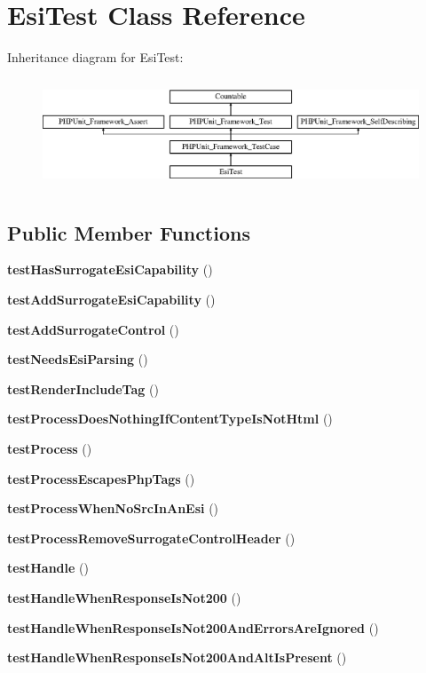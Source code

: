 \section{Esi\+Test Class Reference}
\label{class_symfony_1_1_component_1_1_http_kernel_1_1_tests_1_1_http_cache_1_1_esi_test}
Inheritance diagram for Esi\+Test\+:\begin{figure}[H]
\begin{center}
\leavevmode
\includegraphics[height=3.303835cm]{class_symfony_1_1_component_1_1_http_kernel_1_1_tests_1_1_http_cache_1_1_esi_test}
\end{center}
\end{figure}
\subsection*{Public Member Functions}
\begin{DoxyCompactItemize}
\item 
{\bf test\+Has\+Surrogate\+Esi\+Capability} ()
\item 
{\bf test\+Add\+Surrogate\+Esi\+Capability} ()
\item 
{\bf test\+Add\+Surrogate\+Control} ()
\item 
{\bf test\+Needs\+Esi\+Parsing} ()
\item 
{\bf test\+Render\+Include\+Tag} ()
\item 
{\bf test\+Process\+Does\+Nothing\+If\+Content\+Type\+Is\+Not\+Html} ()
\item 
{\bf test\+Process} ()
\item 
{\bf test\+Process\+Escapes\+Php\+Tags} ()
\item 
{\bf test\+Process\+When\+No\+Src\+In\+An\+Esi} ()
\item 
{\bf test\+Process\+Remove\+Surrogate\+Control\+Header} ()
\item 
{\bf test\+Handle} ()
\item 
{\bf test\+Handle\+When\+Response\+Is\+Not200} ()
\item 
{\bf test\+Handle\+When\+Response\+Is\+Not200\+And\+Errors\+Are\+Ignored} ()
\item 
{\bf test\+Handle\+When\+Response\+Is\+Not200\+And\+Alt\+Is\+Present} ()
\end{DoxyCompactItemize}
